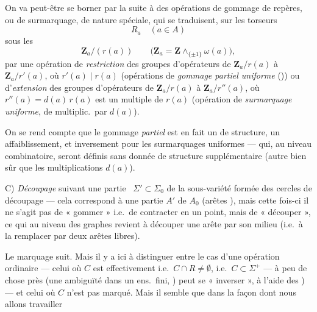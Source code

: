 \documentclass[11pt,a4paper]{article}
\begin{document}

On va peut-être se borner par la suite à des opérations de gommage de
repères, ou de surmarquage, de nature  spéciale, qui
se traduisent, sur les torseurs
\[
R_a \quad (a \in A)
\]
sous les
\[
\mathbf{Z}_a/(r(a)) \qquad \bigl(\mathbf{Z}_a = \mathbf{Z} \wedge_{\lbrace \pm 1 \rbrace} \omega(a)\bigr),
\]
par une opération de \emph{restriction} des groupes d'opérateurs de
$\mathbf{Z}_a/r(a)$ à $\mathbf{Z}_a/r'(a)$, où $r'(a) \mid r(a)$
(opérations de \emph{gommage partiel uniforme} (\ill{})) ou
d'\emph{extension} des groupes d'opérateurs de $\mathbf{Z}_a/r(a)$ à
$\mathbf{Z}_a/r''(a)$, où $r''(a) = d(a)\,r(a)$ est un multiple de $r(a)$
(opération de \emph{surmarquage uniforme}, \ill{} de multiplic.\ par
$d(a)$).

On se rend compte \ill{} que le gommage \emph{partiel} est en fait un
 de structure,  un affaiblissement,
et inversement pour les surmarquages uniformes --- qui, au niveau
combinatoire, seront définis sans donnée de structure supplémentaire (autre
bien sûr que les multiplications $d(a)$).

C) \emph{Découpage}  suivant une partie \
$\Sigma' \subset \Sigma_0$ de la sous-variété formée des cercles de
découpage --- cela correspond à une partie $A'$ de $A_0$ (arêtes
\add{liées} \struck{ordinaires}), mais cette fois-ci il ne s'agit pas de
« gommer » i.e.\ de contracter en un point, mais de « découper », ce qui au
niveau des graphes revient à découper une arête par son milieu (i.e.\ à la
remplacer par deux arêtes libres).

Le marquage suit. Mais il y  a ici à
distinguer entre le cas \add{où $C$} d'une opération ordinaire --- celui où
$C$ est effectivement \struck{marqué} \struck{où il y a \ill{}} i.e.\
$C \cap R \neq \emptyset$, i.e.\ $C \subset \Sigma^{+}$ --- \ill{} à peu de
chose près (une ambiguïté dans un ens.\ fini, \ill{}) peut se
« inverser », à l'aide des \ill{} \ill{}) --- et celui où $C$ n'est pas
marqué. Mais il semble que dans la façon dont nous allons travailler
\end{document}
